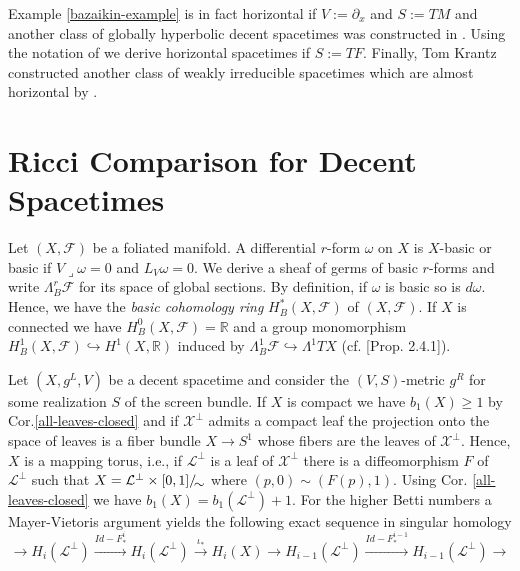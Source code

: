 \documentclass[a4paper,10pt,twoside]{amsart}
\theoremstyle{definition}
\theoremstyle{remark}
\numberwithin{equation}{section}
\begin{document}
Example \ref{bazaikin-example} is in fact horizontal if $V:=\partial_{x}$ and $S:=TM$ and another class of globally hyperbolic decent spacetimes was
constructed in \cite{MR2350042}. Using the notation of \cite{MR2350042} we derive horizontal spacetimes if $S:=TF$.
Finally, Tom Krantz constructed another class of weakly irreducible spacetimes which are almost horizontal by \cite[Prop. 4]{MR2578019}.
\section{Ricci Comparison for Decent Spacetimes}
Let $(X,\mathcal{F})$ be a foliated manifold. A differential $r$-form $\omega$ on $X$ is $X$-basic or basic if $V \lrcorner \omega =0$ and
$L_{V}\omega =0$. We derive a sheaf of germs of basic $r$-forms and write $\Lambda^{r}_{B}\mathcal{F}$ for its space of global sections.
By definition, if $\omega$ is basic so is $d\omega$. Hence, we have the {\em basic cohomology ring} $H^{*}_{B}(X,\mathcal{F})$ of $(X,\mathcal{F})$.
If $X$ is connected we have $H^{0}_{B}(X,\mathcal{F})={\mathbb{R}}$ and a group monomorphism $H^{1}_{B}(X,\mathcal{F}) \hookrightarrow H^{1}(X,{\mathbb{R}})$ induced by
$\Lambda^{1}_{B}\mathcal{F} \hookrightarrow \Lambda^{1}TX$ (cf. \cite{MR2382957}[Prop. 2.4.1]).\par
Let $(X,g^{L},V)$ be a decent spacetime and consider the $(V,S)$-metric $g^{R}$ for some realization $S$ of the screen bundle.
If $X$ is compact we have $b_{1}(X) \geq 1$ by Cor.\ref{all-leaves-closed} and if $\mathcal{X}^{\perp}$ admits a compact leaf the projection onto
the space of leaves is a fiber bundle $X \rightarrow S^{1}$ whose fibers are the leaves of $\mathcal{X}^{\perp}$. Hence, $X$ is a mapping torus, i.e.,
if $\mathcal{L}^{\perp}$ is a leaf of $\mathcal{X}^{\perp}$ there is a diffeomorphism $F$ of $\mathcal{L}^{\perp}$ such that
$X = {{{\mathcal{L}^{\perp} \times [0,1]}}/\!\raisebox{-.575ex}{\ensuremath{{\sim}}}}$ where $(p,0)\sim (F(p),1)$. Using Cor. \ref{all-leaves-closed} we have
$b_{1}(X)=b_{1}(\mathcal{L}^{\perp})+1$. For the higher Betti numbers a Mayer-Vietoris argument yields the following exact sequence in
singular homology
\begin{equation*}
	\longrightarrow H_{i}(\mathcal{L}^{\perp}) \stackrel{Id -F^{i}_{*}}{\longrightarrow} H_{i}(\mathcal{L}^{\perp})
				\stackrel{\iota_{*}}{\longrightarrow} H_{i}(X) \longrightarrow H_{i-1}(\mathcal{L}^{\perp})
			\stackrel{Id -F^{i-1}_{*}}{\longrightarrow} H_{i-1}(\mathcal{L}^{\perp}) \longrightarrow
\end{equation*}
\end{document}

